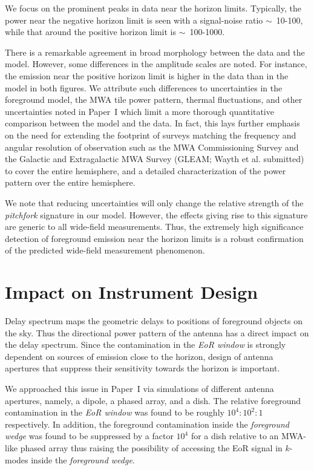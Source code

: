 \documentclass[preprint2,apjl,numberedappendix,twocolappendix,appendixfloats]{emulateapj}
\begin{document}
We focus on the prominent peaks in data near the horizon limits. Typically, the power near the negative horizon limit is seen with a signal-noise ratio $\sim$~10-100, while that around the positive horizon limit is $\sim$~100-1000. 

There is a remarkable agreement in broad morphology between the data and the model. However, some differences in the amplitude scales are noted. For instance, the emission near the positive horizon limit is higher in the data than in the model in both figures. We attribute such differences to uncertainties in the foreground model, the MWA tile power pattern, thermal fluctuations, and other uncertainties noted in Paper~I which limit a more thorough quantitative comparison between the model and the data. In fact, this lays further emphasis on the need for extending the footprint of surveys matching the frequency and angular resolution of observation such as the MWA Commissioning Survey \citep[MWACS;][]{hur14} and the Galactic and Extragalactic MWA Survey (GLEAM; Wayth et al. submitted) to cover the entire hemisphere, and a detailed characterization of the power pattern over the entire hemisphere.

We note that reducing uncertainties will only change the relative strength of the {\it pitchfork} signature in our model. However, the effects giving rise to this signature are generic to all wide-field measurements. Thus, the extremely high significance detection of foreground emission near the horizon limits is a robust confirmation of the predicted wide-field measurement phenomenon.

\section{Impact on Instrument Design}\label{sec:impact}

Delay spectrum maps the geometric delays to positions of foreground objects on the sky. Thus the directional power pattern of the antenna has a direct impact on the delay spectrum. Since the contamination in the {\it EoR window} is strongly dependent on sources of emission close to the horizon, design of antenna apertures that suppress their sensitivity towards the horizon is important. 

We approached this issue in Paper~I via simulations of different antenna apertures, namely, a dipole, a phased array, and a dish. The relative foreground contamination in the {\it EoR window} was found to be roughly $10^4:10^2:1$ respectively. In addition, the foreground contamination inside the {\it foreground wedge} was found to be suppressed by a factor $10^4$ for a dish relative to an MWA-like phased array thus raising the possibility of accessing the EoR signal in $k$-modes inside the {\it foreground wedge}. 
\end{document}
